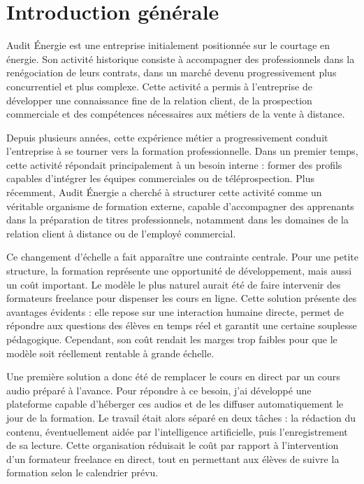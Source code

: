 \section*{Introduction générale}

Audit Énergie est une entreprise initialement positionnée sur le courtage en énergie.
Son activité historique consiste à accompagner des professionnels dans la renégociation
de leurs contrats, dans un marché devenu progressivement plus concurrentiel et plus
complexe. Cette activité a permis à l'entreprise de développer une connaissance fine de
la relation client, de la prospection commerciale et des compétences nécessaires aux
métiers de la vente à distance.

Depuis plusieurs années, cette expérience métier a progressivement conduit l'entreprise
à se tourner vers la formation professionnelle. Dans un premier temps, cette activité
répondait principalement à un besoin interne : former des profils capables d'intégrer les
équipes commerciales ou de téléprospection. Plus récemment, Audit Énergie a cherché à
structurer cette activité comme un véritable organisme de formation externe, capable
d'accompagner des apprenants dans la préparation de titres professionnels, notamment
dans les domaines de la relation client à distance ou de l'employé commercial.

Ce changement d'échelle a fait apparaître une contrainte centrale. Pour une petite
structure, la formation représente une opportunité de développement, mais aussi un coût
important. Le modèle le plus naturel aurait été de faire intervenir des formateurs
freelance pour dispenser les cours en ligne. Cette solution présente des avantages
évidents : elle repose sur une interaction humaine directe, permet de répondre aux
questions des élèves en temps réel et garantit une certaine souplesse pédagogique.
Cependant, son coût rendait les marges trop faibles pour que le modèle soit réellement
rentable à grande échelle.

Une première solution a donc été de remplacer le cours en direct par un cours audio
préparé à l'avance. Pour répondre à ce besoin, j'ai développé une plateforme capable
d'héberger ces audios et de les diffuser automatiquement le jour de la formation. Le
travail était alors séparé en deux tâches : la rédaction du contenu, éventuellement aidée
par l'intelligence artificielle, puis l'enregistrement de sa lecture. Cette organisation
réduisait le coût par rapport à l'intervention d'un formateur freelance en direct, tout en
permettant aux élèves de suivre la formation selon le calendrier prévu.

